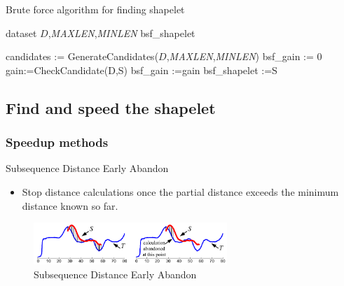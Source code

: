 \documentclass[xetex,mathserif,serif]{beamer}
\begin{document}
\begin{algorithm}
\caption{Brute force algorithm for finding shapelet}
\begin{algorithmic}[1]
\small
\REQUIRE dataset \textbf{$D$},\emph{MAXLEN},\emph{MINLEN}
\ENSURE bsf\_shapelet

\STATE candidates := GenerateCandidates(\textbf{$D$},\emph{MAXLEN},\emph{MINLEN})
\STATE bsf\_gain := 0
\STATE gain:=CheckCandidate(D,S)
\STATE bsf\_gain :=gain
\STATE bsf\_shapelet :=S
\ENDIF
\ENDFOR
\end{algorithmic}
\end{algorithm}

\subsection{Find and speed the shapelet}

\begin{frame}
\frametitle{Speedup methods}
\begin{block}{Subsequence Distance Early Abandon}
\begin{itemize}
  \item Stop distance calculations once the partial distance exceeds the minimum distance known so far.
\end{itemize}
\end{block}

\begin{figure}
  \centering
  \includegraphics[width=0.65\textwidth]{subdistance.png}
  \caption{Subsequence Distance Early Abandon}\label{fig:9}
\end{figure}
\end{frame}
\end{document}
